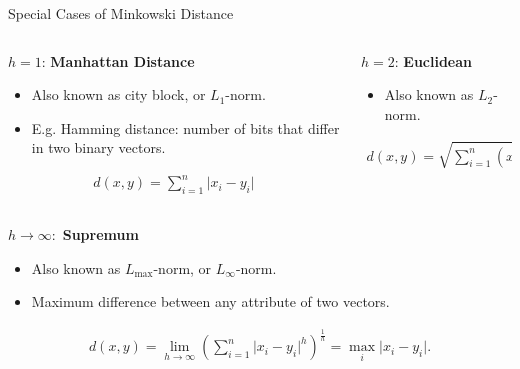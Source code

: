 \begin{frame}{Special Cases of Minkowski Distance}
	\begin{columns}
		\begin{column}{0.45\textwidth}
			$h=1$: \textbf{Manhattan Distance}
			\begin{itemize}
				\item Also known as city block, or $L_1$-norm.
				\item E.g. Hamming distance: number of bits that differ in two binary
				      vectors.
			\end{itemize}
			\vspace*{-1.5em}
			\begin{align*}
				d(x,y) = \sum_{i=1}^{n} \vert x_i - y_i \vert
			\end{align*}
		\end{column}

		\begin{column}{0.45\textwidth}
			$h=2$: \textbf{Euclidean}
			\begin{itemize}
				\item Also known as $L_2$-norm.
			\end{itemize}
			\vspace*{-1.5em}
			\begin{align*}
				d(x,y) = \sqrt{\sum_{i=1}^{n} (x_i-y_i)^2}.
			\end{align*}
		\end{column}

	\end{columns}

	\vspace*{0.1cm}


	$h \rightarrow \infty:$ \textbf{Supremum}
	\begin{itemize}
		\item Also known as $L_{\text{max}}$-norm, or $L_\infty$-norm.
		\item Maximum difference between any attribute of two vectors.
	\end{itemize}
	\vspace*{-1.5em}
	\begin{align*}
		d(x,y) = \lim_{h \rightarrow \infty} \left( \sum_{i=1}^{n} \vert x_i - y_i \vert^{h} \right)^{\frac{1}{h}} = \max_i \vert x_i-y_i \vert.
	\end{align*}

\end{frame}

